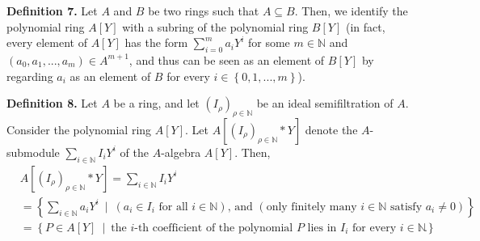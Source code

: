 \documentclass[12pt,final,notitlepage,onecolumn]{article}%
\begin{document}
\textbf{Definition 7.} Let $A$ and $B$ be two rings such that $A\subseteq B$.
Then, we identify the polynomial ring $A\left[  Y\right]  $ with a subring of
the polynomial ring $B\left[  Y\right]  $ (in fact, every element of $A\left[
Y\right]  $ has the form $\sum\limits_{i=0}^{m}a_{i}Y^{i}$ for some
$m\in\mathbb{N}$ and $\left(  a_{0},a_{1},...,a_{m}\right)  \in A^{m+1}$, and
thus can be seen as an element of $B\left[  Y\right]  $ by regarding $a_{i}$
as an element of $B$ for every $i\in\left\{  0,1,...,m\right\}  $).

\textbf{Definition 8.} Let $A$ be a ring, and let $\left(  I_{\rho}\right)
_{\rho\in\mathbb{N}}$ be an ideal semifiltration of $A$. Consider the
polynomial ring $A\left[  Y\right]  $. Let $A\left[  \left(  I_{\rho}\right)
_{\rho\in\mathbb{N}}\ast Y\right]  $ denote the $A$-submodule $\sum
\limits_{i\in\mathbb{N}}I_{i}Y^{i}$ of the $A$-algebra $A\left[  Y\right]  $.
Then,%
\begin{align*}
&  A\left[  \left(  I_{\rho}\right)  _{\rho\in\mathbb{N}}\ast Y\right]
=\sum\limits_{i\in\mathbb{N}}I_{i}Y^{i}\\
&  =\left\{  \sum_{i\in\mathbb{N}}a_{i}Y^{i}\ \mid\ \left(  a_{i}\in
I_{i}\text{ for all }i\in\mathbb{N}\right)  \text{, and }\left(  \text{only
finitely many }i\in\mathbb{N}\text{ satisfy }a_{i}\neq0\right)  \right\} \\
&  =\left\{  P\in A\left[  Y\right]  \ \mid\ \text{the }i\text{-th coefficient
of the polynomial }P\text{ lies in }I_{i}\text{ for every }i\in\mathbb{N}%
\right\}  .
\end{align*}
\end{document}
